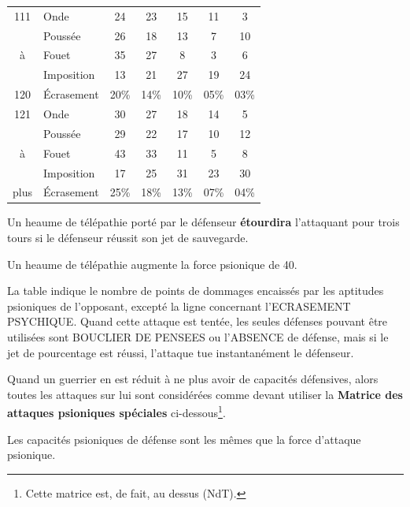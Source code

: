 \documentclass[11pt]{article}
\begin{document}
{\begin{tabular}{clccccc}
111 & Onde       &   24 & 23   & 15   & 11   & 3    \\
    & Poussée    &   26 & 18   & 13   & 7    & 10   \\
à   & Fouet      &   35 & 27   & 8    & 3    & 6    \\
    & Imposition &   13 & 21   & 27   & 19   & 24   \\
120 & Écrasement & 20\% & 14\% & 10\% & 05\% & 03\% \\

121  & Onde       &   30 & 27   & 18   & 14   & 5    \\
     & Poussée    &   29 & 22   & 17   & 10   & 12   \\
à    & Fouet      &   43 & 33   & 11   & 5    & 8    \\
     & Imposition &   17 & 25   & 31   & 23   & 30   \\
plus & Écrasement & 25\% & 18\% & 13\% & 07\% & 04\% \\
\end{tabular}

\bigskip

Un heaume de télépathie porté par le défenseur \textbf{étourdira} l'attaquant pour trois tours si le défenseur réussit son jet de sauvegarde.

\bigskip

Un heaume de télépathie augmente la force psionique de 40.

\bigskip

La table indique le nombre de points de dommages encaissés par les aptitudes psioniques de l'opposant, excepté la ligne concernant l'ECRASEMENT PSYCHIQUE. Quand cette attaque est tentée, les seules défenses pouvant être utilisées sont BOUCLIER DE PENSEES ou l'ABSENCE de défense, mais si le jet de pourcentage est réussi, l'attaque tue instantanément le défenseur.

\bigskip

Quand un guerrier en est réduit à ne plus avoir de capacités défensives, alors toutes les attaques sur lui sont considérées comme devant utiliser la \textbf{Matrice des attaques psioniques spéciales} ci-dessous\footnote{Cette matrice est, de fait, au dessus (NdT).}.

\bigskip

Les capacités psioniques de défense sont les mêmes que la force d'attaque psionique.

}
\end{document}
